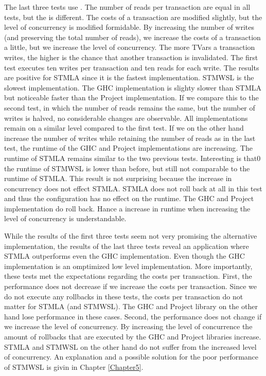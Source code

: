 The last three tests use . The number of reads per transaction are equal in all tests, but the 
 is different. The costs of a transaction are modified slightly, but the level of concurrency
is modified formidable. By increasing the number of writes (and preserving the total number of reads), we increase the costs of a transaction a little, but we 
increase the level of concurrency. The more TVars a transaction writes, the higher is the chance that another transaction is invalidated.
The first test executes ten writes
per transaction and ten reads for each write. The results are positive for STMLA since it is the fastest implementation.
STMWSL is the slowest implementation. The GHC implementation is slighty slower than STMLA but noticeable faster than the 
Project implementation. If we compare this to the second test, in which the number of reads remains the same, but the number of
writes is halved, no considerable changes are observable. All implementations remain on a similar level compared to the first
test. If we on the other hand increase the number of writes while retaining the number of reads as in the last test, the runtime of the
GHC and Project implementations are increasing. The runtime of STMLA remains similar to the two previous tests. 
Interesting is that0 the runtime of STMWSL is lower than before, but still not comparable to the runtime of STMLA.
This result is not surprising because the increase in concurrency does not effect STMLA. STMLA does not roll back at
all in this test and thus the configuration has no effect on the runtime. The GHC and Project implementation do
roll back. Hance a increase in runtime when increasing the level of concurrency is understandable.

While the results of the first three tests seem not very promising the alternative implementation, the results
of the last three tests reveal an application where STMLA outperforms even the GHC implementation. Even though the GHC implementation is 
an omptimized low level  implementation. 
More importantly, these tests met the expectations regarding the costs per transaction. First,
the performance does not decrease if we increase the costs per transaction. Since we do not execute any rollbacks in these 
tests, the costs per transaction do not matter for STMLA (and STMWSL). The GHC and Project library on the other hand 
lose performance in these cases. Second, the performance does not change if we increase the level of concurrency. By increasing
the level of concurrence the amount of rollbacks that are executed by the GHC and Project libraries increase. STMLA and STMWSL
on the other hand do not suffer from the increased level of concurrency. 
An explanation and a possible solution for the poor performance of STMWSL is givin in Chapter \ref{Chapter5}.


